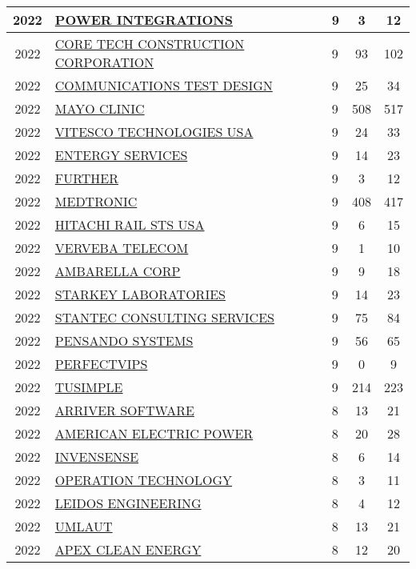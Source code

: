 \documentclass{article}%
\begin{document}
\begin{longtable}{c|p{20em}|p{5em}|c|c}
\hline%
2022&\hyperref[subsec:POWERINTEGRATIONS]{POWER INTEGRATIONS}&9&3&12\\%
\hline%
2022&\hyperref[subsec:CORETECHCONSTRUCTIONCORPORATION]{CORE TECH CONSTRUCTION CORPORATION}&9&93&102\\%
\hline%
2022&\hyperref[subsec:COMMUNICATIONSTESTDESIGN]{COMMUNICATIONS TEST DESIGN}&9&25&34\\%
\hline%
2022&\hyperref[subsec:MAYOCLINIC]{MAYO CLINIC}&9&508&517\\%
\hline%
2022&\hyperref[subsec:VITESCOTECHNOLOGIESUSA]{VITESCO TECHNOLOGIES USA}&9&24&33\\%
\hline%
2022&\hyperref[subsec:ENTERGYSERVICES]{ENTERGY SERVICES}&9&14&23\\%
\hline%
2022&\hyperref[subsec:FURTHER]{FURTHER}&9&3&12\\%
\hline%
2022&\hyperref[subsec:MEDTRONIC]{MEDTRONIC}&9&408&417\\%
\hline%
2022&\hyperref[subsec:HITACHIRAILSTSUSA]{HITACHI RAIL STS USA}&9&6&15\\%
\hline%
2022&\hyperref[subsec:VERVEBATELECOM]{VERVEBA TELECOM}&9&1&10\\%
\hline%
2022&\hyperref[subsec:AMBARELLACORP]{AMBARELLA CORP}&9&9&18\\%
\hline%
2022&\hyperref[subsec:STARKEYLABORATORIES]{STARKEY LABORATORIES}&9&14&23\\%
\hline%
2022&\hyperref[subsec:STANTECCONSULTINGSERVICES]{STANTEC CONSULTING SERVICES}&9&75&84\\%
\hline%
2022&\hyperref[subsec:PENSANDOSYSTEMS]{PENSANDO SYSTEMS}&9&56&65\\%
\hline%
2022&\hyperref[subsec:PERFECTVIPS]{PERFECTVIPS}&9&0&9\\%
\hline%
2022&\hyperref[subsec:TUSIMPLE]{TUSIMPLE}&9&214&223\\%
\hline%
2022&\hyperref[subsec:ARRIVERSOFTWARE]{ARRIVER SOFTWARE}&8&13&21\\%
\hline%
2022&\hyperref[subsec:AMERICANELECTRICPOWER]{AMERICAN ELECTRIC POWER}&8&20&28\\%
\hline%
2022&\hyperref[subsec:INVENSENSE]{INVENSENSE}&8&6&14\\%
\hline%
2022&\hyperref[subsec:OPERATIONTECHNOLOGY]{OPERATION TECHNOLOGY}&8&3&11\\%
\hline%
2022&\hyperref[subsec:LEIDOSENGINEERING]{LEIDOS ENGINEERING}&8&4&12\\%
\hline%
2022&\hyperref[subsec:UMLAUT]{UMLAUT}&8&13&21\\%
\hline%
2022&\hyperref[subsec:APEXCLEANENERGY]{APEX CLEAN ENERGY}&8&12&20\\%

\end{longtable}
\end{document}
